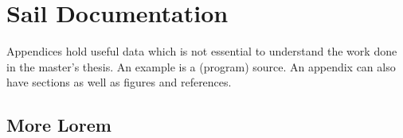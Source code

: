 \chapter{Sail Documentation}
\label{app:saildoc}
Appendices hold useful data which is not essential to understand the work
done in the master's thesis. An example is a (program) source.
An appendix can also have sections as well as figures and references\cite{h2g2}.

\section{More Lorem}
\lipsum[50]

